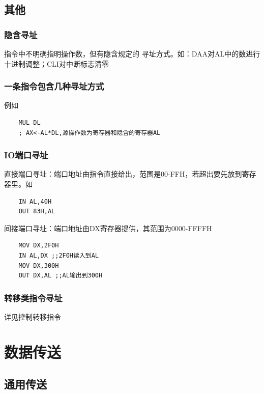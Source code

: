 \subsection{其他}
\subsubsection{隐含寻址}
指令中不明确指明操作数，但有隐含规定的 寻址方式。如：DAA对AL中的数进行十进制调整；CLI对中断标志清零
\subsubsection{一条指令包含几种寻址方式}
例如
\begin{lstlisting}
    MUL DL 
    ; AX<-AL*DL,源操作数为寄存器和隐含的寄存器AL
\end{lstlisting}
\subsubsection{IO端口寻址}
直接端口寻址：端口地址由指令直接给出，范围是00-FFH，若超出要先放到寄存器里。如
\begin{lstlisting}
    IN AL,40H
    OUT 83H,AL
\end{lstlisting}
间接端口寻址：端口地址由DX寄存器提供，其范围为0000-FFFFH
\begin{lstlisting}
    MOV DX,2F0H
    IN AL,DX ;;2F0H读入到AL
    MOV DX,300H
    OUT DX,AL ;;AL输出到300H
\end{lstlisting}
\subsubsection{转移类指令寻址}
详见控制转移指令
\section{数据传送}
\subsection{通用传送}
